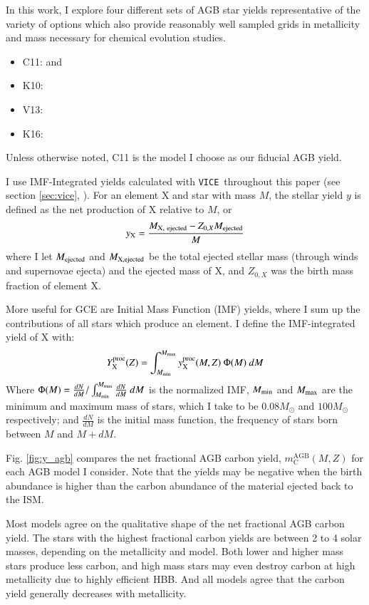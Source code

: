 \documentclass[12pt,oneside]{report}
\newcommand{\VICE}{\texttt{VICE}}
\newcommand{\sun}{\ensuremath{\odot}}
\begin{document}
In this work, I explore four different sets of AGB star yields representative of the variety of options which also provide reasonably well sampled grids in metallicity and mass necessary for chemical evolution studies.
\begin{itemize}
    \item C11: \citet{cristallo+11} and \citet{cristallo+15}
    \item K10: \citet{karakas10}
    \item V13: \citet{ventura+13}
    \item K16: \citet{KL16} \citet{karakas+18}
\end{itemize}
Unless otherwise noted, C11 is the model I choose as our fiducial AGB yield. 

I use IMF-Integrated yields calculated with \VICE~throughout this paper (see
section \ref{sec:vice}, \citet{james+21, james+22}). For an element X and star
with mass $M$, the stellar yield $y$ is defined as the net production of X relative 
to $M$, or
\begin{equation}
    y_{\rm X} = \frac{M_{\rm X,\ ejected} - Z_{0, X} M_{\rm ejected}}{M}   
\end{equation}
where I let $M_{\rm ejected}$ and $M_{\rm X, ejected}$ be the total ejected
stellar mass (through winds and supernovae ejecta) and the ejected mass of X,
and $Z_{0, X}$ was the birth mass fraction of element X.

More useful for GCE are Initial Mass Function (IMF) yields, where I sum up the
contributions of all stars which produce an element.
I define the IMF-integrated yield of X with: 
\begin{equation}
Y_{\rm X}^{\rm proc}(Z) = \int_{M_{\rm min}}^{M_{\rm max}} y_{\rm X}^{\rm proc}(M, Z)\ \Phi(M)  \ dM
\end{equation}
Where $\Phi(M) = \frac{dN}{dM}/ \int_{M_{\rm min}}^{M_{\rm max}} \frac{dN}{dM}\ dM$ is the normalized IMF, $M_{\rm min}$ and $M_{\rm max}$ are the minimum and maximum mass of stars, which I take to be $0.08 M_{\sun}$ and $100 M_{\sun}$ respectively; and $\frac{dN}{dM}$ is the initial mass function, the frequency of stars born between $M$ and $M+dM$.


Fig. \ref{fig:y_agb} compares the net fractional AGB carbon yield, $m_\text{C}^\text{AGB}(M, Z)$ for each AGB model I consider. Note that the yields may be negative when the birth abundance is higher than the carbon abundance of the material ejected back to the ISM. 

Most models agree on the qualitative shape of the net fractional AGB carbon yield. The stars with the highest fractional carbon yields are between 2 to 4 solar masses, depending on the metallicity and model. Both lower and higher mass stars produce less carbon, and high mass stars may even destroy carbon at high metallicity due to highly efficient HBB. And all models agree that the carbon yield generally decreases with metallicity. 
\end{document}
